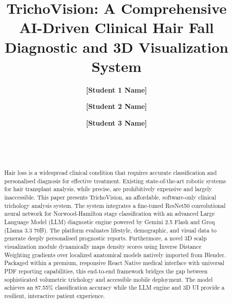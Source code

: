\documentclass[12pt, a4paper]{article}
\begin{document}
\title{\textbf{TrichoVision: A Comprehensive AI-Driven Clinical Hair Fall Diagnostic and 3D Visualization System}}

\author{
    \textbf{[Student 1 Name]} \\ [0.2cm]
    \and
    \textbf{[Student 2 Name]} \\ [0.2cm]
    \and
    \textbf{[Student 3 Name]} \\ [0.8cm]
     \\ [0.2cm]
     \\
     \\
}

\date{}

\maketitle

\begin{abstract}
Hair loss is a widespread clinical condition that requires accurate classification and personalised diagnosis for effective treatment. Existing state-of-the-art robotic systems for hair transplant analysis, while precise, are prohibitively expensive and largely inaccessible. This paper presents TrichoVision, an affordable, software-only clinical trichology analysis system. The system integrates a fine-tuned ResNet50 convolutional neural network for Norwood-Hamilton stage classification with an advanced Large Language Model (LLM) diagnostic engine powered by Gemini 2.5 Flash and Groq (Llama 3.3 70B). The platform evaluates lifestyle, demographic, and visual data to generate deeply personalised prognostic reports. Furthermore, a novel 3D scalp visualization module dynamically maps density scores using Inverse Distance Weighting gradients over localized anatomical models natively imported from Blender. Packaged within a premium, responsive React Native medical interface with universal PDF reporting capabilities, this end-to-end framework bridges the gap between sophisticated volumetric trichology and accessible mobile deployment. The model achieves an 87.55\% classification accuracy while the LLM engine and 3D UI provide a resilient, interactive patient experience.
\end{abstract}

\vspace{0.5cm}
\end{document}
